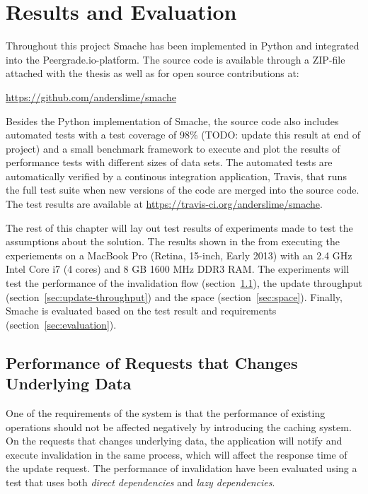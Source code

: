 \chapter{Results and Evaluation}
\label{chapter:tests-and-evaluation}

Throughout this project Smache has been implemented in Python and integrated into the Peergrade.io-platform. The source code is available through a ZIP-file attached with the thesis as well as for open source contributions at:

\url{https://github.com/anderslime/smache}

Besides the Python implementation of Smache, the source code also includes automated tests with a test coverage of 98\% (TODO: update this result at end of project) and a small benchmark framework to execute and plot the results of performance tests with different sizes of data sets. The automated tests are automatically verified by a continous integration application, Travis, that runs the full test suite when new versions of the code are merged into the source code. The test results are available at \url{https://travis-ci.org/anderslime/smache}.

The rest of this chapter will lay out test results of experiments made to test the assumptions about the solution. The results shown in the from executing the experiements on a MacBook Pro (Retina, 15-inch, Early 2013) with an 2.4 GHz Intel Core i7 (4 cores) and 8 GB 1600 MHz DDR3 RAM. The experiments will test the performance of the invalidation flow (section~\ref{sec:performance}), the update throughput (section~\ref{sec:update-throughput}) and the space (section~\ref{sec:space}). Finally, Smache is evaluated based on the test result and requirements (section~\ref{sec:evaluation}).

\section{Performance of Requests that Changes Underlying Data}
\label{sec:performance}

One of the requirements of the system is that the performance of existing operations should not be affected negatively by introducing the caching system. On the requests that changes underlying data, the application will notify and execute invalidation in the same process, which will affect the response time of the update request. The performance of invalidation have been evaluated using a test that uses both \emph{direct dependencies} and \emph{lazy dependencies}.

